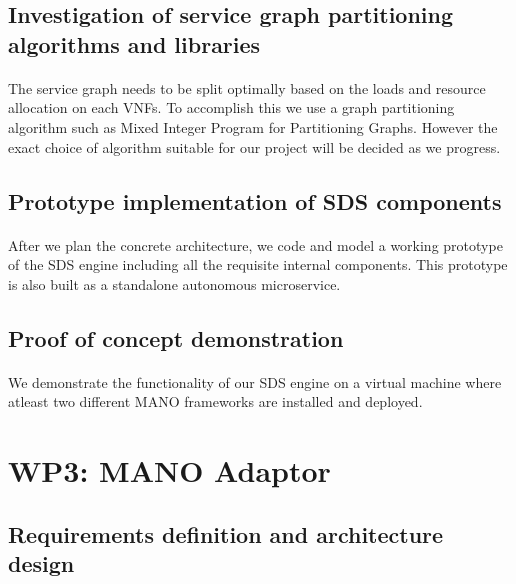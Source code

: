 \subsection{Investigation of service graph partitioning algorithms and libraries}
\paragraph{}
The service graph needs to be split optimally based on the loads and resource allocation on each VNFs. To accomplish this we use a graph partitioning algorithm such as Mixed Integer Program for Partitioning Graphs. However the exact choice of algorithm suitable for our project will be decided as we progress.
\subsection{Prototype implementation of SDS components}
\paragraph{}
After we plan the concrete architecture, we code and model a working prototype of the SDS engine including all the requisite internal components. This prototype is also built as a standalone autonomous microservice.
\subsection{Proof of concept demonstration}
\paragraph{}
We demonstrate the functionality of our SDS engine on a virtual machine where atleast two different MANO frameworks are installed and deployed.

\section{WP3: MANO Adaptor}

\subsection{Requirements definition and architecture design}
\paragraph{}

